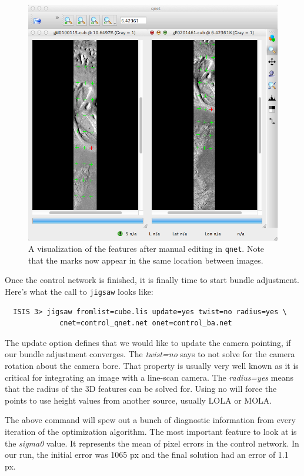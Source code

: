\begin{figure}[ht]
  \centering
  \includegraphics[width=5in]{images/qnet/Qnet_AfterQnetManual.png}
  \caption{A visualization of the features after manual editing in
    \texttt{qnet}. Note that the marks now appear in the same location
    between images.}
  \label{fig:after_autoseed}
\end{figure}

Once the control network is finished, it is finally time to start
bundle adjustment. Here's what the call to \texttt{jigsaw} looks like:

\begin{verbatim}
  ISIS 3> jigsaw fromlist=cube.lis update=yes twist=no radius=yes \
             cnet=control_qnet.net onet=control_ba.net
\end{verbatim}

The update option defines that we would like to update the camera
pointing, if our bundle adjustment converges. The \textit{twist=no}
says to not solve for the camera rotation about the camera bore. That
property is usually very well known as it is critical for integrating
an image with a line-scan camera. The \textit{radius=yes} means that
the radius of the 3D features can be solved for. Using no will force
the points to use height values from another source, usually LOLA or
MOLA.

The above command will spew out a bunch of diagnostic information from
every iteration of the optimization algorithm. The most important
feature to look at is the \textit{sigma0} value. It represents the mean of
pixel errors in the control network. In our run, the initial error was
1065 px and the final solution had an error of 1.1 px.

